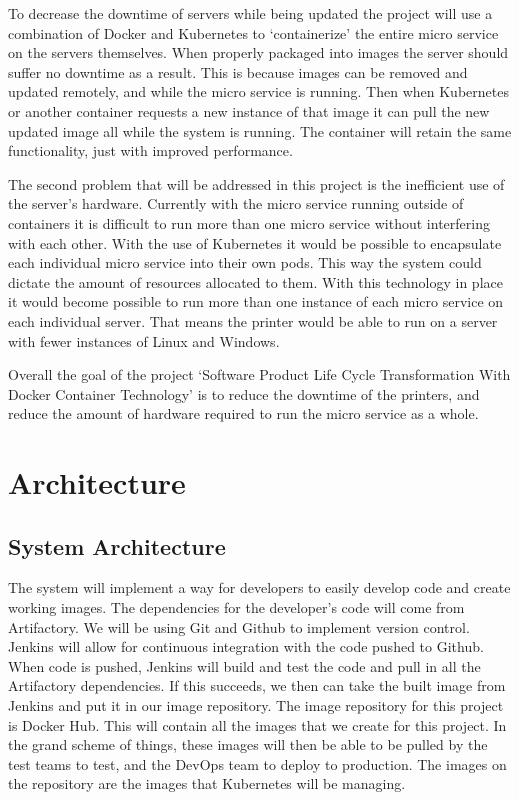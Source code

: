 \documentclass[onecolumn, draftclsnofoot,10pt, compsoc]{IEEEtran}
\begin{document}
To decrease the downtime of servers while being updated the project will use a combination of Docker and Kubernetes to ‘containerize’ the entire micro service on the servers themselves. When properly packaged into images the server should suffer no downtime as a result. This is because images can be removed and updated remotely, and while the micro service is running. Then when Kubernetes or another container requests a new instance of that image it can pull the new updated image all while the system is running. The container will retain the same functionality, just with improved performance.

The second problem that will be addressed in this project is the inefficient use of the server's hardware. Currently with the micro service running outside of containers it is difficult to run more than one micro service without interfering with each other. With the use of Kubernetes it would be possible to encapsulate each individual micro service into their own pods. This way the system could dictate the amount of resources allocated to them. With this technology in place it would become possible to run more than one instance of each micro service on each individual server. That means the printer would be able to run on a server with fewer instances of Linux and Windows.

Overall the goal of the project ‘Software Product Life Cycle Transformation With Docker Container Technology’ is to reduce the downtime of the printers, and reduce the amount of hardware required to run the micro service as a whole.




\newpage
\section{Architecture}

\subsection{System Architecture}

The system will implement a way for developers to easily develop code and create working images. The dependencies for the developer’s code will come from Artifactory. We will be using Git and Github to implement version control. Jenkins will allow for continuous integration with the code pushed to Github. When code is pushed, Jenkins will build and test the code and pull in all the Artifactory dependencies. If this succeeds, we then can take the built image from Jenkins and put it in our image repository. The image repository for this project is Docker Hub. This will contain all the images that we create for this project. In the grand scheme of things, these images will then be able to be pulled by the test teams to test, and the DevOps team to deploy to production. The images on the repository are the images that Kubernetes will be managing. 
\end{document}
